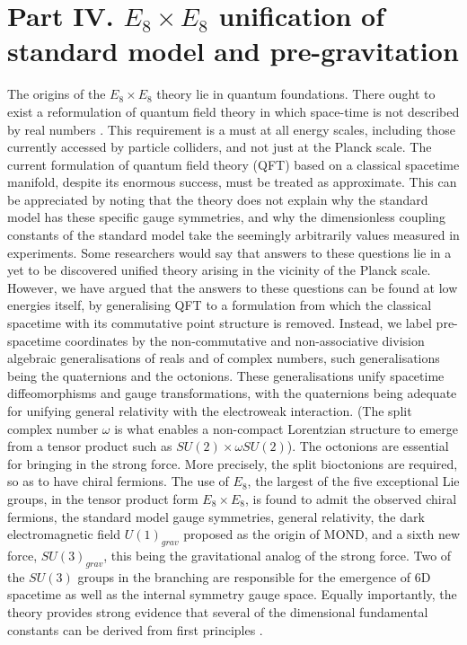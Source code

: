 \documentclass{iopconfser}
\begin{document}
\section{Part IV.  $E_8\times E_8$ unification of standard model and pre-gravitation }

  The origins of the $E_8 \times E_8$ theory lie in quantum foundations. There ought to exist a reformulation of quantum field theory in which space-time is not described by real numbers \cite{Singh1}. This requirement is a must at all energy scales, including those currently accessed by particle colliders, and not just at the Planck scale. The current formulation of quantum field theory (QFT) based on a classical spacetime manifold, despite its enormous success, must be treated as approximate. This can be appreciated by noting that the theory does not explain why the standard model has these specific gauge symmetries, and why the dimensionless coupling constants of the standard model take the seemingly arbitrarily values measured in experiments. Some researchers would say that answers to these questions lie in a yet to be discovered unified theory arising in the vicinity of the Planck scale. However, we have argued \cite{Singh1} that the answers to these questions can be found at low energies itself, by generalising QFT to a formulation from which the classical spacetime with its commutative point structure is removed. Instead, we label pre-spacetime coordinates by the non-commutative and non-associative division algebraic generalisations of reals and of complex numbers, such generalisations being the quaternions and the octonions. These generalisations unify spacetime diffeomorphisms and gauge transformations, with the quaternions being adequate for unifying general relativity with the electroweak interaction. (The split complex number $\omega$ is what enables a non-compact Lorentzian structure  to emerge from a tensor product such as $SU(2) \times \omega SU(2)$). The octonions are essential for bringing in the strong force. More precisely, the split bioctonions are required, so as to have chiral fermions. The use of $E_8$, the largest of the five exceptional Lie groups, in the tensor product form $E_8 \times E_8$, is found to admit the observed chiral fermions, the standard model gauge symmetries, general relativity, the dark electromagnetic field $U(1)_{grav}$ proposed as the origin of MOND, and a sixth new force, $SU(3)_{grav}$, this being the gravitational analog of the strong force. Two of the $SU(3)$ groups in the branching are responsible for the emergence of 6D spacetime \cite{Kau} as well as the internal symmetry  gauge space. Equally importantly, the theory provides strong evidence that several of the dimensional fundamental constants can be derived from first principles \cite{Singh1}.
\end{document}
